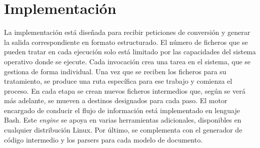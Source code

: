 
\chapter{Implementación}
\label{chap:implemetación}

La implementación está diseñada para recibir peticiones de conversión y generar la salida correspondiente en formato estructurado. El número de ficheros que se pueden tratar en cada ejecución solo está limitado por las capacidades del sistema operativo donde se ejecute. Cada invocación crea una tarea en el sistema, que se gestiona de forma individual. Una vez que se reciben los ficheros para su tratamiento, se produce una ruta específica para ese trabajo y comienza el proceso. En cada etapa se crean nuevos ficheros intermedios que, según se verá más adelante, se mueven a destinos designados para cada paso. El motor encargado de conducir el flujo de información está implementado en lenguaje Bash. Este \emph{engine} se apoya en varias herramientas adicionales, disponibles en cualquier distribución Linux. Por último, se complementa con el generador de código intermedio y los parsers para cada modelo de documento.





